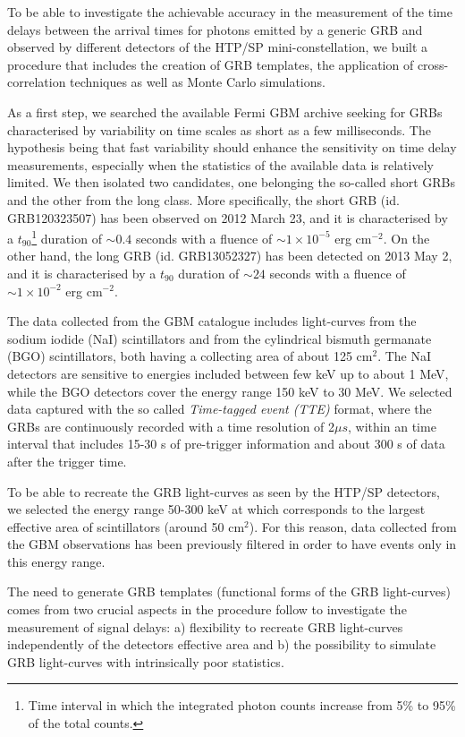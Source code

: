 \documentclass[]{spie}  %
\def \us{$\mu s$\xspace}
\begin{document}
To be able to investigate the achievable accuracy in the measurement of the time delays between the arrival times for photons emitted by a generic GRB and observed by different detectors of the HTP/SP mini-constellation, we built a procedure that includes the creation of GRB templates, the application of cross-correlation techniques as well as Monte Carlo simulations.

As a first step, we searched the available Fermi GBM archive seeking for GRBs characterised by variability on time scales as short as a few milliseconds. The hypothesis being that fast variability should enhance the sensitivity on time delay measurements, especially when the statistics of the available data is relatively limited. We then isolated two candidates, one belonging the so-called short GRBs and the other from the long class. More specifically, the short GRB (id. GRB120323507) has been observed on 2012 March 23, and it is characterised by a $t_{90}$\footnote{Time interval in which the integrated photon counts increase from 5\% to 95\% of the total counts.} duration of $\sim0.4$ seconds with a fluence of $\sim1\times10^{-5}$ erg cm$^{-2}$. On the other hand, the long GRB (id. GRB13052327) has been detected on 2013 May 2, and it is characterised by a $t_{90}$ duration of $\sim24$ seconds with a fluence of $\sim1\times10^{-2}$ erg cm$^{-2}$.

The data collected from the GBM catalogue includes light-curves from the sodium iodide (NaI) scintillators and from the cylindrical bismuth germanate (BGO) scintillators, both having a collecting area of about 125 cm$^2$. The NaI detectors are sensitive to energies included between few keV up to about 1 MeV, while the BGO detectors cover the energy range 150 keV to 30 MeV. We selected data captured with the so called \textit{Time-tagged event (TTE)} format, where the GRBs are continuously recorded with a time resolution of 2\us, within an time interval that includes 15-30 s of pre-trigger information and about 300 s of data after the trigger time.

To be able to recreate the GRB light-curves as seen by the HTP/SP detectors, we selected the energy range 50-300 keV at which corresponds to the largest effective area of scintillators (around 50 cm$^2$). For this reason, data collected from the GBM observations has been previously filtered in order to have events only in this energy range.

The need to generate GRB templates (functional forms of the GRB light-curves) comes from two crucial aspects in the procedure follow to investigate the measurement of signal delays: a) flexibility to recreate GRB light-curves independently of the detectors effective area and b) the possibility to simulate GRB light-curves with intrinsically poor statistics.  
\end{document}

